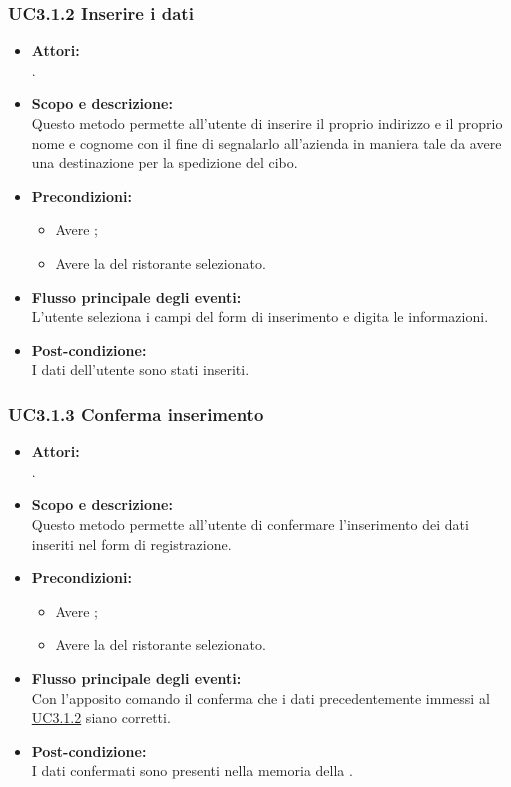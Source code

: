 \subsubsection{UC3.1.2 Inserire i dati} \label{UC3.1.2}

\begin{itemize}
	\item \textbf{Attori:}
	\\.
	\item \textbf{Scopo e descrizione:} 
	\\Questo metodo permette all'utente di inserire il proprio indirizzo e il proprio nome e cognome con il fine di segnalarlo all'azienda in maniera tale da avere una destinazione per la spedizione del cibo.
	\item \textbf{Precondizioni:}
	\begin{itemize}
		\item Avere ;
		\item Avere la  del ristorante selezionato.
	\end{itemize}
	\item \textbf{Flusso principale degli eventi:}
	\\L'utente seleziona i campi del form di inserimento e digita le informazioni.
	\item \textbf{Post-condizione:}
	\\I dati dell'utente sono stati inseriti.
\end{itemize}

\subsubsection{UC3.1.3 Conferma inserimento} \label{UC3.1.3}

\begin{itemize}
	\item \textbf{Attori:}
	\\.
	\item \textbf{Scopo e descrizione:} 
	\\Questo metodo permette all'utente di confermare l'inserimento dei dati inseriti nel form di registrazione.
	\item \textbf{Precondizioni:}
	\begin{itemize}
		\item Avere ;
		\item Avere la  del ristorante selezionato.
	\end{itemize}
	\item \textbf{Flusso principale degli eventi:}
	\\Con l'apposito comando il  conferma che i dati precedentemente immessi al  \hyperref[UC3.1.2]{UC3.1.2} siano corretti.
	\item \textbf{Post-condizione:}
	\\I dati confermati sono presenti nella memoria della .
\end{itemize}

